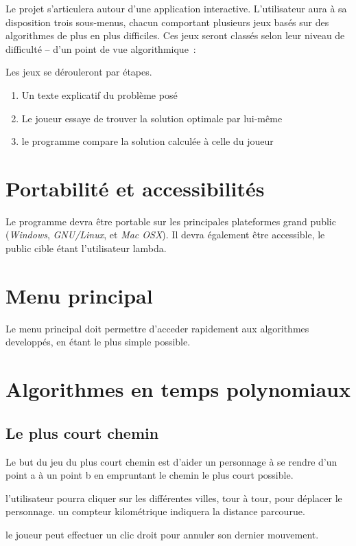 Le projet s'articulera autour d'une application interactive.
  L'utilisateur aura à sa disposition trois sous-menus, chacun comportant
  plusieurs jeux basés sur des algorithmes de plus en plus difficiles.
  Ces jeux seront classés selon leur niveau de difficulté -- d'un point de
  vue algorithmique~:

Les jeux se dérouleront par étapes.
\begin{enumerate}
    \item Un texte explicatif du problème posé
    \item Le joueur essaye de trouver la solution optimale par lui-même
    \item le programme compare la solution calculée à celle du joueur
\end{enumerate}

\section{Portabilité et accessibilités}
    Le programme devra être portable sur les principales plateformes
    grand public (\emph{Windows}, \emph{GNU/Linux}, et \emph{Mac OSX}).
    Il devra également être accessible, le public cible étant
    l'utilisateur lambda.

\section{Menu principal}
    Le menu principal doit permettre d'acceder rapidement
    aux algorithmes developpés, en étant le plus simple possible.

\section{Algorithmes en temps polynomiaux}
    \subsection{Le plus court chemin}
        Le but du jeu du plus court chemin est d'aider un personnage à se
        rendre d'un point a à un point b en empruntant le chemin le plus
        court possible.

        l'utilisateur pourra cliquer sur les différentes villes, tour à tour,
        pour déplacer le personnage. un compteur kilométrique indiquera la
        distance parcourue.

        le joueur peut effectuer un clic droit pour annuler son dernier
        mouvement.

